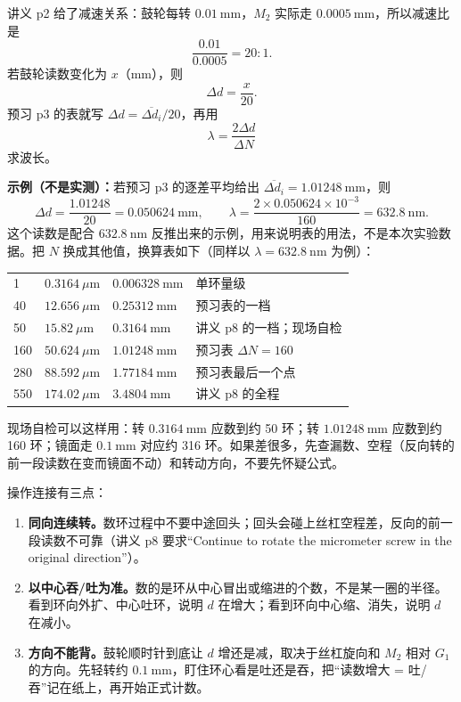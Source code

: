 \documentclass[11pt]{ctexart}
\begin{document}
讲义 p2 给了减速关系：鼓轮每转 \(0.01\ \mathrm{mm}\)，\(M_2\) 实际走 \(0.0005\ \mathrm{mm}\)，所以减速比是
\[
\frac{0.01}{0.0005}=20:1 .
\]
若鼓轮读数变化为 \(x\)（mm），则
\[
\Delta d=\frac{x}{20}.
\]
预习 p3 的表就写 \(\Delta d=\overline{\Delta d_i}/20\)，再用
\[
\lambda=\frac{2\Delta d}{\Delta N}
\]
求波长。

\textbf{示例（不是实测）：}若预习 p3 的逐差平均给出 \(\overline{\Delta d_i}=1.01248\ \mathrm{mm}\)，则
\[
\Delta d=\frac{1.01248}{20}=0.050624\ \mathrm{mm},
\qquad
\lambda=\frac{2\times0.050624\times10^{-3}}{160}=632.8\ \mathrm{nm}.
\]
这个读数是配合 \(632.8\ \mathrm{nm}\) 反推出来的示例，用来说明表的用法，不是本次实验数据。把 \(N\) 换成其他值，换算表如下（同样以 \(\lambda=632.8\ \mathrm{nm}\) 为例）：

\begin{center}
\small
\begin{tabular}{@{}C{1.6cm}C{3.2cm}C{4.0cm}C{5.4cm}@{}}
\toprule
{} &  &  & \\
 & \(0.3164\ \mu\mathrm{m}\) & \(0.006328\ \mathrm{mm}\) & 单环量级\\
40 & \(12.656\ \mu\mathrm{m}\) & \(0.25312\ \mathrm{mm}\) & 预习表的一档\\
50 & \(15.82\ \mu\mathrm{m}\) & \(0.3164\ \mathrm{mm}\) & 讲义 p8 的一档；现场自检\\
160 & \(50.624\ \mu\mathrm{m}\) & \(1.01248\ \mathrm{mm}\) & 预习表 \(\Delta N=160\)\\
280 & \(88.592\ \mu\mathrm{m}\) & \(1.77184\ \mathrm{mm}\) & 预习表最后一个点\\
550 & \(174.02\ \mu\mathrm{m}\) & \(3.4804\ \mathrm{mm}\) & 讲义 p8 的全程\\
\bottomrule
\end{tabular}
\end{center}

现场自检可以这样用：转 \(0.3164\ \mathrm{mm}\) 应数到约 50 环；转 \(1.01248\ \mathrm{mm}\) 应数到约 160 环；镜面走 \(0.1\ \mathrm{mm}\) 对应约 316 环。如果差很多，先查漏数、空程（反向转的前一段读数在变而镜面不动）和转动方向，不要先怀疑公式。

操作连接有三点：

\begin{enumerate}[label=(\arabic*),leftmargin=2.2em]
\item \textbf{同向连续转。}数环过程中不要中途回头；回头会碰上丝杠空程差，反向的前一段读数不可靠（讲义 p8 要求“Continue to rotate the micrometer screw in the original direction”）。
\item \textbf{以中心吞/吐为准。}数的是环从中心冒出或缩进的个数，不是某一圈的半径。看到环向外扩、中心吐环，说明 \(d\) 在增大；看到环向中心缩、消失，说明 \(d\) 在减小。
\item \textbf{方向不能背。}鼓轮顺时针到底让 \(d\) 增还是减，取决于丝杠旋向和 \(M_2\) 相对 \(G_1\) 的方向。先轻转约 \(0.1\ \mathrm{mm}\)，盯住环心看是吐还是吞，把“读数增大 = 吐/吞”记在纸上，再开始正式计数。
\end{enumerate}
\end{document}

